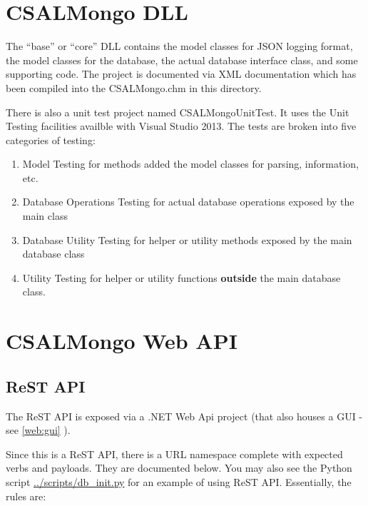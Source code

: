 \documentclass[letterpaper,10pt]{article}
\newcommand{\fullxref}[1]{ \ref{#1} \nameref{#1} }
\begin{document}

\section{CSALMongo DLL}

The ``base'' or ``core'' DLL contains the model classes for JSON logging
format, the model classes for the database, the actual database interface
class, and some supporting code.  The project is documented via XML documentation
which has been compiled into the CSALMongo.chm in this directory.

There is also a unit test project named CSALMongoUnitTest. It uses the Unit
Testing facilities availble with Visual Studio 2013. The tests are broken into
five categories of testing:

\begin{enumerate}
    \item Model Testing for methods added the model classes for
          parsing, information, etc.
    
    \item Database Operations Testing for actual database operations exposed
          by the main class
    
    \item Database Utility Testing for helper or utility methods exposed by
          the main database class
    
    \item Utility Testing for helper or utility functions \textbf{outside} the 
          main database class.
\end{enumerate}




\section{CSALMongo Web API}
\label{sec:webapi}

\subsection{ReST API}

The ReST API is exposed via a .NET Web Api project (that also houses a GUI - 
see \fullxref{web:gui}).

Since this is a ReST API, there is a URL namespace complete with expected verbs
and payloads.  They are documented below. You may also see the Python script
\url{../scripts/db_init.py} for an example
of using ReST API.  Essentially, the rules are:
\end{document}
